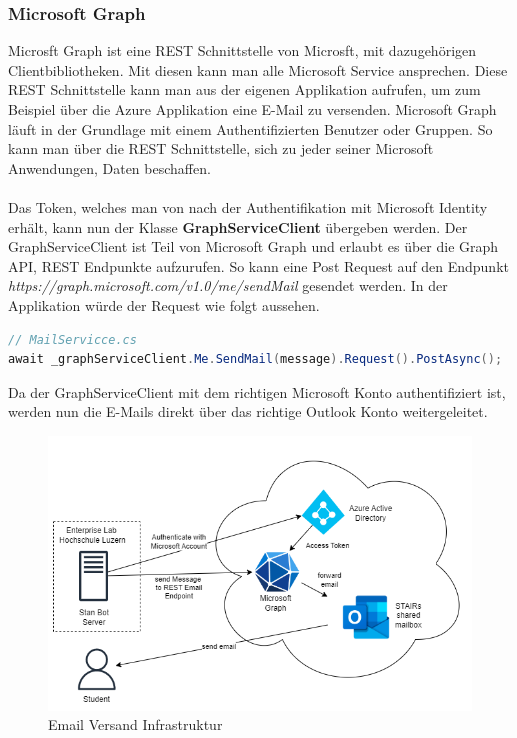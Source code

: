 \documentclass[a4paper, table]{article}
\begin{document}
\subsubsection*{Microsoft Graph}
Microsft Graph ist eine REST Schnittstelle von Microsft, mit dazugehörigen Clientbibliotheken.
Mit diesen kann man alle Microsoft Service ansprechen. \autocite{angelgolfer-ms_microsoft_nodate}
Diese REST Schnittstelle kann man aus der eigenen Applikation aufrufen, um zum Beispiel über die Azure Applikation eine E-Mail zu versenden.
Microsoft Graph läuft in der Grundlage mit einem Authentifizierten Benutzer oder Gruppen.
So kann man über die REST Schnittstelle, sich zu jeder seiner Microsoft Anwendungen, Daten beschaffen.\\\\
Das Token, welches man von nach der Authentifikation mit Microsoft Identity erhält, kann nun der Klasse \textbf{GraphServiceClient} übergeben werden.
Der GraphServiceClient ist Teil von Microsoft Graph und erlaubt es über die Graph API, REST Endpunkte aufzurufen.
So kann eine Post Request auf den Endpunkt \textit{https://graph.microsoft.com/v1.0/me/sendMail} gesendet werden.
In der Applikation würde der Request wie folgt aussehen.

\begin{lstlisting}[language=csharp]
// MailServicce.cs
await _graphServiceClient.Me.SendMail(message).Request().PostAsync();
\end{lstlisting}

Da der GraphServiceClient mit dem richtigen Microsoft Konto authentifiziert ist, 
werden nun die E-Mails direkt über das richtige Outlook Konto weitergeleitet.

\begin{figure}[h]
    \centering
    \includegraphics[width=1\textwidth]{img/Email_Infrastruktur.png}
    \caption{Email Versand Infrastruktur}
    \label{fig:send-email-infrastructure}
\end{figure}
\end{document}
